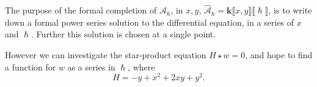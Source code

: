    The purpose of the formal completion of \( \mathcal{A}_{\hslash}\), in \(x,y\), \( \widehat{\mathcal{A}}_{\hslash} = \mathbf{k}\lBrack x, y\rBrack \lBrack \hslash \rBrack\),  is to write down a formal power series solution to the differential equation, in a series of \(x\) and \(\hslash\). Further this solution is chosen at a single point.
    
    However we can investigate the star-product equation \( H \star w =0 \), and hope to find a function for \(w\) as a series in \(\hslash\), where 
    \[ H = -y + x^2 + 2 x y + y^2.\]
